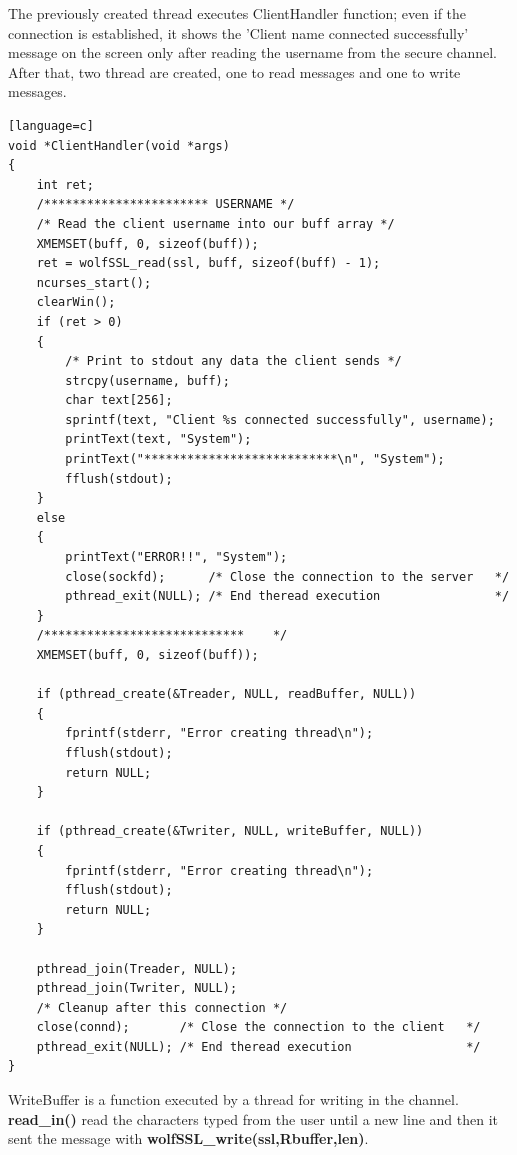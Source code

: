 \documentclass[a4paper,12pt]{report}
\begin{document}
The previously created thread executes ClientHandler function; even if the connection is established, it shows the 'Client name connected successfully' message on the screen only after reading the username from the secure channel.
\\After that, two thread are created, one to read messages and one to write messages.
\begin{lstlisting}[caption={ClientHandler() of SSL server},captionpos=b][language=c]
void *ClientHandler(void *args)
{
    int ret;
    /*********************** USERNAME */
    /* Read the client username into our buff array */
    XMEMSET(buff, 0, sizeof(buff));
    ret = wolfSSL_read(ssl, buff, sizeof(buff) - 1);
    ncurses_start();
    clearWin();
    if (ret > 0)
    {
        /* Print to stdout any data the client sends */
        strcpy(username, buff);
        char text[256];
        sprintf(text, "Client %s connected successfully", username);
        printText(text, "System");
        printText("***************************\n", "System");
        fflush(stdout);
    }
    else
    {
        printText("ERROR!!", "System");
        close(sockfd);      /* Close the connection to the server   */
        pthread_exit(NULL); /* End theread execution                */
    }
    /****************************    */
    XMEMSET(buff, 0, sizeof(buff));

    if (pthread_create(&Treader, NULL, readBuffer, NULL))
    {
        fprintf(stderr, "Error creating thread\n");
        fflush(stdout);
        return NULL;
    }

    if (pthread_create(&Twriter, NULL, writeBuffer, NULL))
    {
        fprintf(stderr, "Error creating thread\n");
        fflush(stdout);
        return NULL;
    }

    pthread_join(Treader, NULL);
    pthread_join(Twriter, NULL);
    /* Cleanup after this connection */
    close(connd);       /* Close the connection to the client   */
    pthread_exit(NULL); /* End theread execution                */
}

\end{lstlisting}
WriteBuffer is a function executed by a thread for writing in the channel. \textbf{read\_in()} read the characters typed from the user until a new line and then it sent the message with \textbf{wolfSSL\_write(ssl,Rbuffer,len)}.
\end{document}
